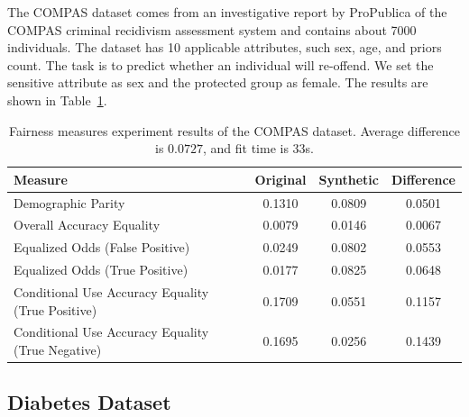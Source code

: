 \documentclass[manuscript,screen,review,anonymous]{acmart}
\begin{document}
The COMPAS\cite{larson2016propublica,Kaggle_COMPAS_Dataset} dataset comes from an investigative report by ProPublica of the COMPAS criminal recidivism assessment system and contains about 7000 individuals. The dataset has 10 applicable attributes, such sex, age, and priors count. The task is to predict whether an individual will re-offend. We set the sensitive attribute as sex and the protected group as female. The results are shown in Table~\ref{tab:compas_score}.



\begin{table}[h]
\caption{
    Fairness measures experiment results of the COMPAS dataset.
    Average difference is $0.0727$, and fit time is 33s.
}
\label{tab:compas_score}
\begin{tabular}{lccc}
\toprule
\textbf{Measure} & \textbf{Original} & \textbf{Synthetic} & \textbf{Difference} \\
\midrule
Demographic Parity  & 0.1310 & 0.0809 & 0.0501 \\
Overall Accuracy Equality   & 0.0079 & 0.0146 & 0.0067 \\
Equalized Odds (False Positive)    & 0.0249 & 0.0802 & 0.0553 \\
Equalized Odds (True Positive)    & 0.0177 & 0.0825 & 0.0648 \\
Conditional Use Accuracy Equality (True Positive) & 0.1709 & 0.0551 & 0.1157 \\
Conditional Use Accuracy Equality (True Negative) & 0.1695 & 0.0256 & 0.1439 \\
\bottomrule
\end{tabular}
\end{table}

\subsection{Diabetes Dataset}
\end{document}
